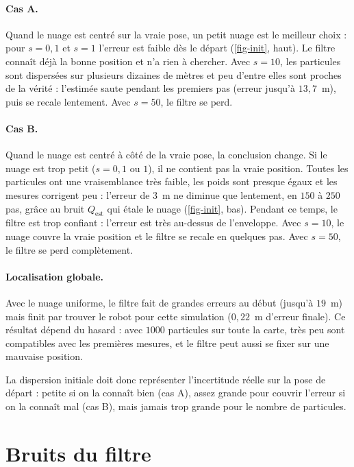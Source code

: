 \documentclass[11pt]{article}
\theoremstyle{definition}
\theoremstyle{remark}
\begin{document}
\paragraph{Cas A.} Quand le nuage est centré sur la vraie pose, un petit nuage
est le meilleur choix : pour $s = 0{,}1$ et $s = 1$ l'erreur est faible dès le
départ (\cref{fig-init}, haut). Le filtre connaît déjà la bonne position et
n'a rien à chercher. Avec $s = 10$, les particules sont dispersées sur
plusieurs dizaines de mètres et peu d'entre elles sont proches de la vérité :
l'estimée saute pendant les premiers pas (erreur jusqu'à $13{,}7$~m), puis se
recale lentement. Avec $s = 50$, le filtre se perd.

\paragraph{Cas B.} Quand le nuage est centré à côté de la vraie pose, la
conclusion change. Si le nuage est trop petit ($s = 0{,}1$ ou $1$), il ne
contient pas la vraie position. Toutes les particules ont une vraisemblance
très faible, les poids sont presque égaux et les mesures corrigent peu :
l'erreur de $3$~m ne diminue que lentement, en $150$ à $250$ pas, grâce au
bruit $Q_{\mathrm{est}}$ qui étale le nuage (\cref{fig-init}, bas). Pendant ce
temps, le filtre est trop confiant : l'erreur est très au-dessus de
l'enveloppe. Avec $s = 10$, le nuage couvre la vraie position et le filtre se
recale en quelques pas. Avec $s = 50$, le filtre se perd complètement.

\paragraph{Localisation globale.} Avec le nuage uniforme, le filtre fait de
grandes erreurs au début (jusqu'à $19$~m) mais finit par trouver le robot pour
cette simulation ($0{,}22$~m d'erreur finale). Ce résultat dépend du hasard :
avec $1000$ particules sur toute la carte, très peu sont compatibles avec les
premières mesures, et le filtre peut aussi se fixer sur une mauvaise position.

La dispersion initiale doit donc représenter l'incertitude réelle sur la pose
de départ : petite si on la connaît bien (cas A), assez grande pour couvrir
l'erreur si on la connaît mal (cas B), mais jamais trop grande pour le nombre
de particules.

\section{Bruits du filtre}
\end{document}
